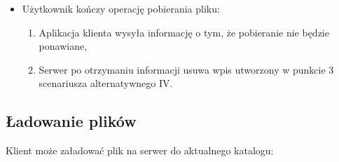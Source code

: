 \documentclass[10pt,a4paper]{article}
\begin{document}
\begin{itemize}
\begin{enumerate}
\begin{itemize}
            \item Użytkownik kończy operację pobierania pliku:
            \begin{enumerate}
                \item Aplikacja klienta wysyła informację o tym, że pobieranie nie będzie ponawiane,
                \item Serwer po otrzymaniu informacji usuwa wpis utworzony w punkcie 3 scenariusza alternatywnego IV.
            \end{enumerate}
        \end{itemize}
    \end{enumerate}
\end{itemize}

\subsection{Ładowanie plików}
\noindent Klient może załadować plik na serwer do aktualnego katalogu:
\end{document}
